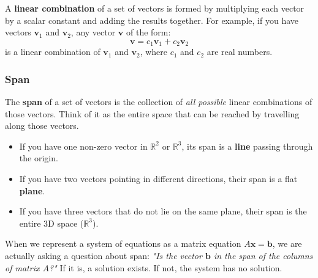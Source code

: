 A \textbf{linear combination} of a set of vectors is formed by multiplying each vector by a scalar constant and adding the results together. For example, if you have vectors $\mathbf{v}_1$ and $\mathbf{v}_2$, any vector $\mathbf{v}$ of the form:
\[ \mathbf{v} = c_1\mathbf{v}_1 + c_2\mathbf{v}_2 \]
is a linear combination of $\mathbf{v}_1$ and $\mathbf{v}_2$, where $c_1$ and $c_2$ are real numbers.

\subsubsection*{Span}
The \textbf{span} of a set of vectors is the collection of \emph{all possible} linear combinations of those vectors. Think of it as the entire space that can be reached by travelling along those vectors.

\begin{itemize}[leftmargin=*]
    \item If you have one non-zero vector in $\mathbb{R}^2$ or $\mathbb{R}^3$, its span is a \textbf{line} passing through the origin.
    \item If you have two vectors pointing in different directions, their span is a flat \textbf{plane}.
    \item If you have three vectors that do not lie on the same plane, their span is the entire 3D space ($\mathbb{R}^3$).
\end{itemize}

When we represent a system of equations as a matrix equation $A\mathbf{x} = \mathbf{b}$, we are actually asking a question about span: \emph{"Is the vector $\mathbf{b}$ in the span of the columns of matrix $A$?"} If it is, a solution exists. If not, the system has no solution.
